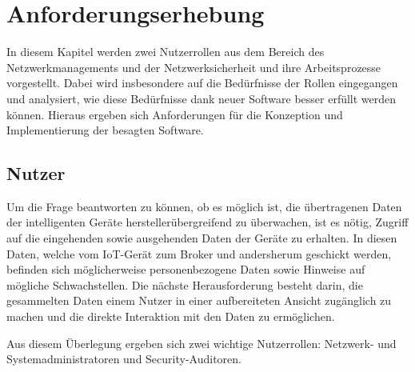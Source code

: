 \chapter{Anforderungserhebung}
In diesem Kapitel werden zwei Nutzerrollen aus dem Bereich des Netzwerkmanagements und der Netzwerksicherheit und ihre Arbeitsprozesse vorgestellt. Dabei wird insbesondere auf die Bedürfnisse der Rollen eingegangen und analysiert, wie diese Bedürfnisse dank neuer Software besser erfüllt werden können. Hieraus ergeben sich Anforderungen für die Konzeption und Implementierung der besagten Software.

\section{Nutzer}
    Um die Frage beantworten zu können, ob es möglich ist, die übertragenen Daten der intelligenten Geräte herstellerübergreifend zu überwachen, ist es nötig, Zugriff auf die eingehenden sowie ausgehenden Daten der Geräte zu erhalten. In diesen Daten, welche vom \ac{IoT}-Gerät zum Broker und andersherum geschickt werden, befinden sich möglicherweise personenbezogene Daten sowie Hinweise auf mögliche Schwachstellen.
    Die nächste Herausforderung besteht darin, die gesammelten Daten einem Nutzer in einer aufbereiteten Ansicht zugänglich zu machen und die direkte Interaktion mit den Daten zu ermöglichen.

    Aus diesem Überlegung ergeben sich zwei wichtige Nutzerrollen: Netzwerk- und Systemadministratoren und Security-Auditoren.
    
